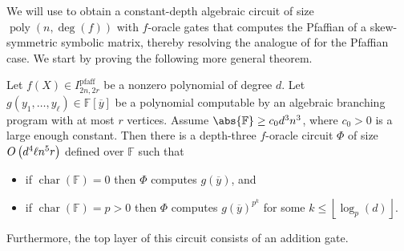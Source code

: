 \documentclass[10pt,a4paper]{amsart}
\DeclareMathOperator{\pfaff}{pfaff}
\DeclareMathOperator{\characteristic}{char}
\DeclareMathOperator{\poly}{poly}
\newcommand*\F{\mathbb{F}}
\newcommand*\floor[1]{%
    \left\lfloor #1 \right\rfloor
}
\newcommand*\bigO[1]{%
    O\kern-0.0pt\left(#1\right)
}
\begin{document}
We will use  to obtain a constant-depth algebraic circuit of size $\poly(n,\deg(f))$ with $f$-oracle gates that computes the Pfaffian of a skew-symmetric symbolic matrix, thereby resolving the analogue of  for the Pfaffian case. We start by proving the following more general theorem.
\begin{thrm}\label{thrm:ABP_pfaff_oracle}
    Let $f(X) \in I^{\pfaff}_{2n, 2r}$ be a nonzero polynomial of degree $d$.
    Let $g(y_1, \ldots, y_\ell) \in \F[\overline{y}]$ be a polynomial computable by an algebraic branching program with at most $r$ vertices.
    Assume $\abs{\F} \geq c_0 d^3 n^3$, where $c_0>0$ is a large enough constant.
    Then there is a depth-three $f$-oracle circuit $\Phi$ of size $\bigO{d^4 \ell n^5 r}$ defined over $\F$ such that 
    \begin{itemize}
        \item if $\characteristic(\F) = 0$ then $\Phi$ computes $g(\overline{y})$, and
        \item if $\characteristic(\F) = p > 0$ then $\Phi$ computes $g(\overline{y})^{p^k}$ for some $k \leq \floor{\log_p(d)}$.
    \end{itemize}
    Furthermore, the top layer of this circuit consists of an addition gate.
\end{thrm}
\end{document}
